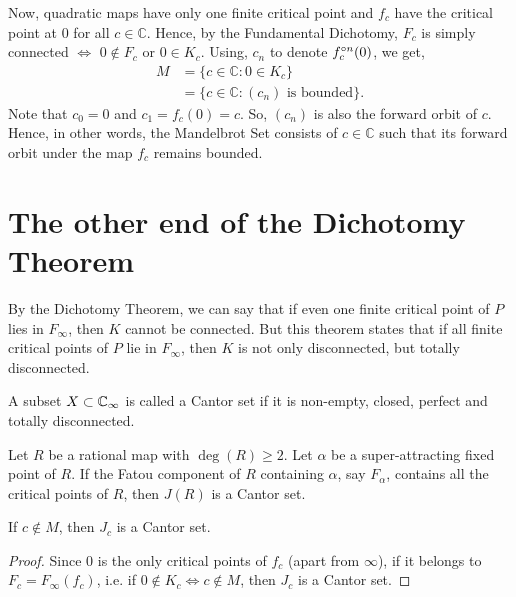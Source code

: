 Now, quadratic maps have only one finite critical point and \( f_c \) have the critical point at \( 0 \) for all \( c\in \mathbb{C} \).
Hence, by the Fundamental Dichotomy, \( F_c \) is simply connected \( \iff \) \( 0\not\in F_c \) or \( 0\in K_c \). Using, \( c_n \) to denote \( \fcof[n](0) \),
we get,
\begin{align*}
	M&=\{c\in \mathbb{C}:0\in K_c\}\\
	 &=\{c\in \mathbb{C}:(c_n)\text{ is bounded}\}
.\end{align*}
Note that \( c_0=0 \) and \( c_1=f_c(0)=c \). So, \( (c_n) \) is also the forward orbit of \( c \). Hence, in other words,
the Mandelbrot Set consists of \( c\in \mathbb{C} \) such that its forward orbit under the map \( f_c \)
remains bounded.

\section{The other end of the Dichotomy Theorem}
By the Dichotomy Theorem, we can say that if even one finite critical point of \( P \) lies in \( F_\infty \), then \( K \)
cannot be connected. But this theorem states that if all finite critical points of \( P \) lie in \( F_\infty \), then
\( K \) is not only disconnected, but totally disconnected.

\begin{definition}
	A subset \( X\subset \mathbb{C}_\infty \) is called a Cantor set if it is non-empty, closed, perfect and totally disconnected.
\end{definition}

\begin{theorem}
	Let \( R \) be a rational map with \( \deg(R)\ge 2 \). Let \( \alpha \) be a super-attracting fixed
	point of \( R \). If the Fatou component of \( R \) containing \( \alpha \), say \( F_\alpha \),
	contains all the critical points of \( R \), then \( J(R) \) is a Cantor set.
\end{theorem}

\begin{corollary}
	If \( c\not\in M \), then \( J_c \) is a Cantor set.
\end{corollary}
\begin{proof}
	Since \( 0 \) is the only critical points of \( f_c \) (apart from \( \infty \)), if it belongs to \( F_c=F_\infty(f_c) \), 
	i.e. if \( 0\not\in K_c \iff c\not\in M \), then \( J_c \) is a Cantor set.
\end{proof}

